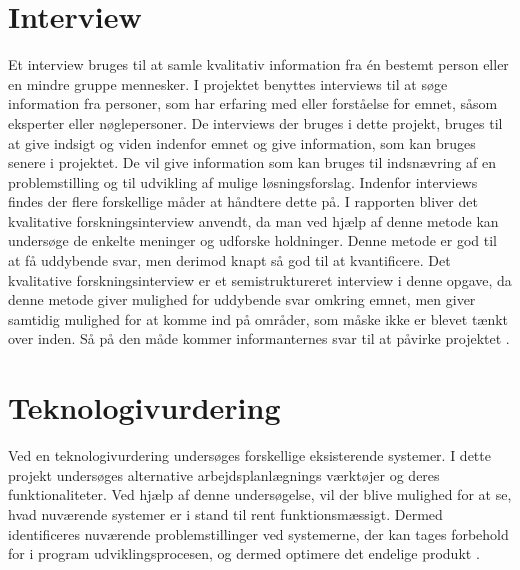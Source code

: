 \section{Interview}
Et interview bruges til at samle kvalitativ information fra én bestemt person eller en mindre gruppe mennesker. I projektet benyttes interviews til at søge information fra personer, som har erfaring med eller forståelse for emnet, såsom eksperter eller nøglepersoner. De interviews der bruges i dette projekt, bruges til at give indsigt og viden indenfor emnet og give information, som kan bruges senere i projektet. De vil give information som kan bruges til indsnævring af en problemstilling og til udvikling af mulige løsningsforslag.
Indenfor interviews findes der flere forskellige måder at håndtere dette på. I rapporten bliver det kvalitative forskningsinterview anvendt, da man ved hjælp af denne metode kan undersøge de enkelte meninger og udforske holdninger. Denne metode er god til at få uddybende svar, men derimod knapt så god til at kvantificere.
Det kvalitative forskningsinterview er et semistruktureret interview i denne opgave, da denne metode giver mulighed for uddybende svar omkring emnet, men giver samtidig mulighed for at komme ind på områder, som måske ikke er blevet tænkt over inden. Så på den måde kommer informanternes svar til at påvirke projektet \citep{BjarneHjorthAndersen, kvale2009}.

\section{Teknologivurdering}
Ved en teknologivurdering undersøges forskellige eksisterende systemer. I dette projekt undersøges alternative arbejdsplanlægnings værktøjer og deres funktionaliteter. Ved hjælp af denne undersøgelse, vil der blive mulighed for at se, hvad nuværende systemer er i stand til rent funktionsmæssigt. Dermed identificeres nuværende problemstillinger ved systemerne, der kan tages forbehold for i program udviklingsprocesen, og dermed optimere det endelige produkt \citep{PeterLarsen}.




